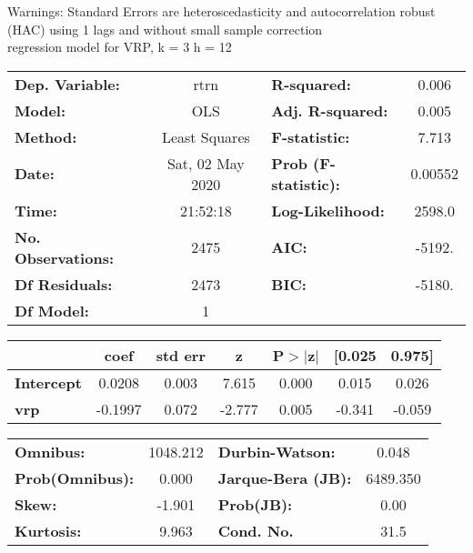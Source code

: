 Warnings: \newline
 [1] Standard Errors are heteroscedasticity and autocorrelation robust (HAC) using 1 lags and without small sample correction\\ 

regression model for VRP, k = 3 h = 12\begin{center}
\begin{tabular}{lclc}
\toprule
\textbf{Dep. Variable:}    &       rtrn       & \textbf{  R-squared:         } &     0.006   \\
\textbf{Model:}            &       OLS        & \textbf{  Adj. R-squared:    } &     0.005   \\
\textbf{Method:}           &  Least Squares   & \textbf{  F-statistic:       } &     7.713   \\
\textbf{Date:}             & Sat, 02 May 2020 & \textbf{  Prob (F-statistic):} &  0.00552    \\
\textbf{Time:}             &     21:52:18     & \textbf{  Log-Likelihood:    } &    2598.0   \\
\textbf{No. Observations:} &        2475      & \textbf{  AIC:               } &    -5192.   \\
\textbf{Df Residuals:}     &        2473      & \textbf{  BIC:               } &    -5180.   \\
\textbf{Df Model:}         &           1      & \textbf{                     } &             \\
\bottomrule
\end{tabular}
\begin{tabular}{lcccccc}
                   & \textbf{coef} & \textbf{std err} & \textbf{z} & \textbf{P$> |$z$|$} & \textbf{[0.025} & \textbf{0.975]}  \\
\midrule
\textbf{Intercept} &       0.0208  &        0.003     &     7.615  &         0.000        &        0.015    &        0.026     \\
\textbf{vrp}       &      -0.1997  &        0.072     &    -2.777  &         0.005        &       -0.341    &       -0.059     \\
\bottomrule
\end{tabular}
\begin{tabular}{lclc}
\textbf{Omnibus:}       & 1048.212 & \textbf{  Durbin-Watson:     } &    0.048  \\
\textbf{Prob(Omnibus):} &   0.000  & \textbf{  Jarque-Bera (JB):  } & 6489.350  \\
\textbf{Skew:}          &  -1.901  & \textbf{  Prob(JB):          } &     0.00  \\
\textbf{Kurtosis:}      &   9.963  & \textbf{  Cond. No.          } &     31.5  \\
\bottomrule
\end{tabular}
\end{center}

